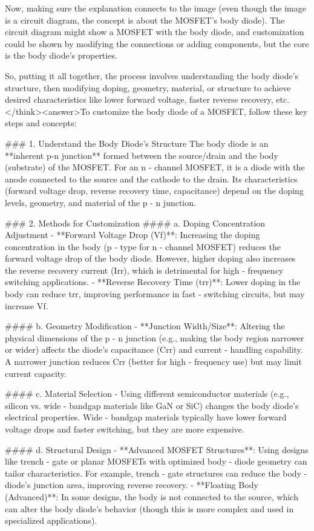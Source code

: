 Now, making sure the explanation connects to the image (even though the image is a circuit diagram, the concept is about the MOSFET's body diode). The circuit diagram might show a MOSFET with the body diode, and customization could be shown by modifying the connections or adding components, but the core is the body diode's properties.

So, putting it all together, the process involves understanding the body diode's structure, then modifying doping, geometry, material, or structure to achieve desired characteristics like lower forward voltage, faster reverse recovery, etc.</think><answer>To customize the body diode of a MOSFET, follow these key steps and concepts:  


### 1. Understand the Body Diode’s Structure  
The body diode is an **inherent p-n junction** formed between the source/drain and the body (substrate) of the MOSFET. For an n - channel MOSFET, it is a diode with the anode connected to the source and the cathode to the drain. Its characteristics (forward voltage drop, reverse recovery time, capacitance) depend on the doping levels, geometry, and material of the p - n junction.  


### 2. Methods for Customization  
#### a. Doping Concentration Adjustment  
- **Forward Voltage Drop (Vf)**: Increasing the doping concentration in the body (p - type for n - channel MOSFET) reduces the forward voltage drop of the body diode. However, higher doping also increases the reverse recovery current (Irr), which is detrimental for high - frequency switching applications.  
- **Reverse Recovery Time (trr)**: Lower doping in the body can reduce trr, improving performance in fast - switching circuits, but may increase Vf.  

#### b. Geometry Modification  
- **Junction Width/Size**: Altering the physical dimensions of the p - n junction (e.g., making the body region narrower or wider) affects the diode’s capacitance (Crr) and current - handling capability. A narrower junction reduces Crr (better for high - frequency use) but may limit current capacity.  

#### c. Material Selection  
- Using different semiconductor materials (e.g., silicon vs. wide - bandgap materials like GaN or SiC) changes the body diode’s electrical properties. Wide - bandgap materials typically have lower forward voltage drops and faster switching, but they are more expensive.  

#### d. Structural Design  
- **Advanced MOSFET Structures**: Using designs like trench - gate or planar MOSFETs with optimized body - diode geometry can tailor characteristics. For example, trench - gate structures can reduce the body - diode’s junction area, improving reverse recovery.  
- **Floating Body (Advanced)**: In some designs, the body is not connected to the source, which can alter the body diode’s behavior (though this is more complex and used in specialized applications).  

